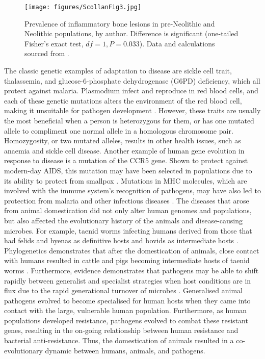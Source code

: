 	\begin{figure}[!htb]
		\texttt{[image: figures/ScollanFig3.jpg]}
		\caption{Prevalence of inflammatory bone lesions in pre-Neolithic and Neolithic populations, by author. Difference is significant (one-tailed Fisher’s exact test, $df=1, P=0.033$). Data and calculations sourced from \cite{Eshed_2010}.}
		\label{fig:ScollanFig3} %
	\end{figure}
The classic genetic examples of adaptation to disease are sickle cell trait, thalassemia, and glucose-6-phosphate dehydrogenase (G6PD) deficiency, which all protect against malaria. 
Plasmodium infect and reproduce in red blood cells, and each of these genetic mutations alters the environment of the red blood cell, making it unsuitable for pathogen development \parencites[235]{Balter_2005}{Durham_1991}. However, these traits are usually the most beneficial when a person is heterozygous for them, or has one mutated allele to compliment one normal allele in a homologous chromosome pair. 
Homozygosity, or two mutated alleles, results in other health issues, such as anaemia and sickle cell disease. Another example of human gene evolution in response to disease is a mutation of the CCR5 gene. Shown to protect against modern-day AIDS, this mutation may have been selected in populations due to its ability to protect from smallpox \parencite[235]{Balter_2005}. 
Mutations in MHC molecules, which are involved with the immune system’s recognition of pathogens, may have also led to protection from malaria and other infectious diseases \parencite[2038]{Hill_2001}. 
The diseases that arose from animal domestication did not only alter human genomes and populations, but also affected the evolutionary history of the animals and disease-causing microbes. 
For example, taenid worms infecting humans derived from those that had felids and hyenas as definitive hosts and bovids as intermediate hosts \parencite[785--786]{Hoberg_2001}. 
Phylogenetics demonstrates that after the domestication of animals, close contact with humans resulted in cattle and pigs becoming intermediate hosts of taenid worms \parencites[376]{Pearce-Duvet_2006}{Schmidt_1989}. Furthermore, evidence demonstrates that pathogens may be able to shift rapidly between generalist and specialist strategies when host conditions are in flux due to the rapid generational turnover of 
microbes \parencite[539]{Wolinsky_1996}. 
Generalised animal pathogens evolved to become specialised for human hosts when they came into contact with the large, vulnerable human population. Furthermore, as human populations developed resistance, pathogens evolved to combat these resistant genes, resulting in the on-going relationship between human resistance and bacterial anti-resistance. 
Thus, the domestication of animals resulted in a co-evolutionary dynamic between humans, animals, and pathogens.

